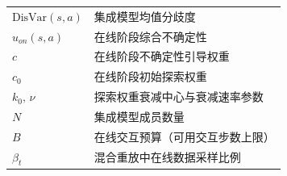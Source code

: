 \begin{denoabbre}
\begin{supertabular}{p{4cm}p{9cm}}
    $\text{DisVar}(s,a)$  &  集成模型均值分歧度 \\
    $u_{on}(s,a)$  &  在线阶段综合不确定性 \\
    $c$  &  在线阶段不确定性引导权重 \\
    $c_0$  &  在线阶段初始探索权重 \\
    $k_0,\,\nu$  &  探索权重衰减中心与衰减速率参数 \\
    $N$  &  集成模型成员数量 \\
    $B$  &  在线交互预算（可用交互步数上限） \\
    $\beta_t$  &  混合重放中在线数据采样比例 \\


  \end{supertabular}  \vspace{50pt}


   \vspace{-13pt} \\


\end{denoabbre}
